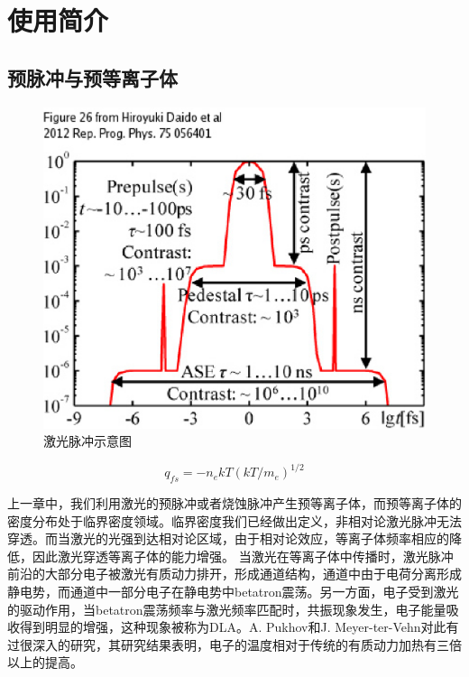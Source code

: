 

\chapter{使用简介}
\label{chap:preplasmaEhancement}

\section{预脉冲与预等离子体}
\begin{figure}[!htbp]
  \centering
  \includegraphics[width=\MyFactor\textwidth]{Img/prepulse2012.eps}
  \caption{激光脉冲示意图}
  \label{fig:prepulse2012}
\end{figure}

\begin{equation}
\label{eqn:freeStream}
q_{fs}=-n_e k T (k T / m_e)^{1/2}
\end{equation} 







上一章中，我们利用激光的预脉冲或者烧蚀脉冲产生预等离子体，而预等离子体的密度分布处于临界密度领域。临界密度我们已经做出定义，非相对论激光脉冲无法穿透。而当激光的光强到达相对论区域，由于相对论效应，等离子体频率相应的降低，因此激光穿透等离子体的能力增强。
当激光在等离子体中传播时，激光脉冲前沿的大部分电子被激光有质动力排开，形成通道结构，通道中由于电荷分离形成静电势，而通道中一部分电子在静电势中betatron震荡。另一方面，电子受到激光的驱动作用，当betatron震荡频率与激光频率匹配时，共振现象发生，电子能量吸收得到明显的增强，这种现象被称为DLA。A. Pukhov和J. Meyer-ter-Vehn对此有过很深入的研究，其研究结果表明，电子的温度相对于传统的有质动力加热有三倍以上的提高。



